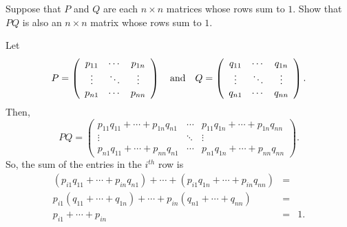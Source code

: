\documentclass{ximera}
\begin{document}
\begin{exercise} \label{c4.10.4}
Suppose that $P$ and $Q$ are each $n\times n$ matrices whose rows sum to $1$.
Show that $PQ$ is also an $n\times n$ matrix whose rows sum to $1$.

\begin{solution}

Let
\[
P = \left(\begin{array}{ccc} p_{11} & \cdots & p_{1n} \\
\vdots & \ddots & \vdots \\ p_{n1} & \cdots & p_{nn}
\end{array}\right) \quad\mbox{and}\quad Q = \left(\begin{array}{ccc} q_{11} &
\cdots & q_{1n} \\ \vdots & \ddots & \vdots \\ q_{n1} & \cdots
& q_{nn} \end{array}\right).
\]
Then,
\[
PQ = \left(\begin{array}{ccc} p_{11}q_{11} + \cdots + p_{1n}q_{n1}
& \cdots & p_{11}q_{1n} + \cdots + p_{1n}q_{nn} \\
\vdots & \ddots & \vdots \\ p_{n1}q_{11} + \cdots + p_{nn}q_{n1}
& \cdots & p_{n1}q_{1n} + \cdots + p_{nn}q_{nn} \end{array}\right).
\]
So, the sum of the entries in the $i^{th}$ row is
\[
\begin{array}{rcl}
(p_{i1}q_{11} + \cdots + p_{in}q_{n1}) + \cdots + (p_{i1}q_{1n} +
\cdots + p_{in}q_{nn}) & = & \\
p_{i1}(q_{11} + \cdots + q_{1n}) + \cdots + p_{in}(q_{n1} +
\cdots + q_{nn}) & = & \\ p_{i1} + \cdots + p_{in} & = & 1.
\end{array}
\]

\end{solution}
\end{exercise}
\end{document}
